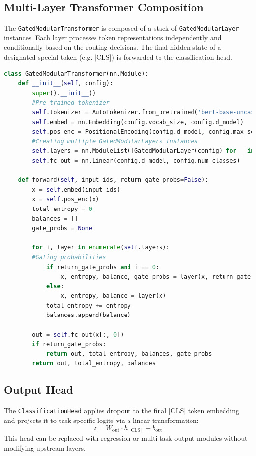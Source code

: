 \documentclass{article}
\begin{document}
\subsection{Multi-Layer Transformer Composition}
The \texttt{GatedModularTransformer} is composed of a stack of \texttt{GatedModularLayer} instances. Each layer processes token representations independently and conditionally based on the routing decisions. The final hidden state of a designated special token (e.g. [CLS]) is forwarded to the classification head.

\vspace{3pt}
\begin{lstlisting}[language=Python, caption=GMT module., label={lst:gmt}]
class GatedModularTransformer(nn.Module):
    def __init__(self, config):
        super().__init__()
        #Pre-trained tokenizer
        self.tokenizer = AutoTokenizer.from_pretrained('bert-base-uncased')
        self.embed = nn.Embedding(config.vocab_size, config.d_model)
        self.pos_enc = PositionalEncoding(config.d_model, config.max_seq_len)
        #Creating multiple GatedModularLayers instances
        self.layers = nn.ModuleList([GatedModularLayer(config) for _ in range(config.num_layers)])
        self.fc_out = nn.Linear(config.d_model, config.num_classes)
    
    def forward(self, input_ids, return_gate_probs=False):
        x = self.embed(input_ids)
        x = self.pos_enc(x)
        total_entropy = 0
        balances = []
        gate_probs = None

        for i, layer in enumerate(self.layers):
        #Gating probabilities 
            if return_gate_probs and i == 0:
                x, entropy, balance, gate_probs = layer(x, return_gate_probs=True)
            else:
                x, entropy, balance = layer(x)
            total_entropy += entropy
            balances.append(balance)

        out = self.fc_out(x[:, 0])
        if return_gate_probs:
            return out, total_entropy, balances, gate_probs
        return out, total_entropy, balances
\end{lstlisting}


\subsection{Output Head}
The \texttt{ClassificationHead} applies dropout to the final [CLS] token embedding and projects it to task-specific logits via a linear transformation:
\[
z = W_{\mathrm{out}} \cdot h_{[\mathrm{CLS}]} + b_{\mathrm{out}}
\]
This head can be replaced with regression or multi-task output modules without modifying upstream layers.
\end{document}
